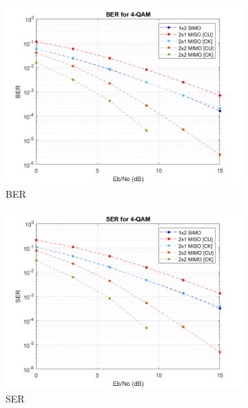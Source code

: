 \documentclass{article}
\begin{document}
\begin{figure}[H]
\begin{subfigure}{0.5\textwidth}
		\centerline{\includegraphics[width=1\textwidth]{4qamber_eb.png}}
		\caption{BER}
	\end{subfigure}%
	\begin{subfigure}{0.5\textwidth}
		\centerline{\includegraphics[width=1\textwidth]{4qamser_eb.png}}
		\caption{SER}
	\end{subfigure}\\%
	\caption{}
\end{figure}
\end{document}
